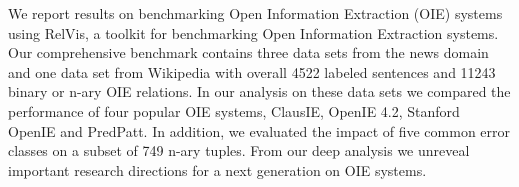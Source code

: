 We report results on benchmarking Open Information Extraction (OIE) systems using RelVis, a toolkit for benchmarking Open Information Extraction systems. Our comprehensive benchmark contains three data sets from the news domain and one data set from Wikipedia with overall 4522 labeled sentences and 11243 binary or n-ary OIE relations. In our analysis on these data sets we compared the performance of four popular OIE systems, ClausIE, OpenIE 4.2, Stanford OpenIE and PredPatt. In addition, we evaluated the impact of five common error classes on a subset of 749 n-ary tuples. From our deep analysis we unreveal important research directions for a next generation on OIE systems.
